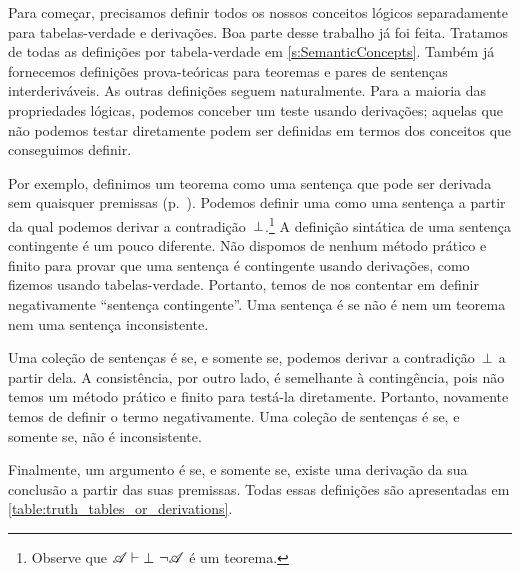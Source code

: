 Para começar, precisamos definir todos os nossos conceitos lógicos separadamente para tabelas-verdade e derivações. Boa parte desse trabalho já foi feita. Tratamos de todas as definições por tabela-verdade em \cref{s:SemanticConcepts}. Também já fornecemos definições prova-teóricas para teoremas e pares de sentenças interderiváveis. As outras definições seguem naturalmente. Para a maioria das propriedades lógicas, podemos conceber um teste usando derivações; aquelas que não podemos testar diretamente podem ser definidas em termos dos conceitos que conseguimos definir.

Por exemplo, definimos um teorema como uma sentença que pode ser derivada
sem quaisquer premissas (p.~\pageref{def:syntactic_tautology_in_sl}).
Podemos definir uma %
\label{def:syntactic_contradiction_in_sl} como uma sentença a partir da qual
podemos derivar a contradição~$\bot$.\footnote{Observe que $\mathscr{A}
\vdash \bot$ \ifeff{} $\lnot \mathscr{A}$ é um teorema.} A definição sintática
de uma sentença contingente é um pouco diferente. Não dispomos de nenhum
método prático e finito para provar que uma sentença é contingente usando
derivações, como fizemos usando tabelas-verdade. Portanto, temos de nos
contentar em definir negativamente ``sentença contingente''. Uma sentença é
\label{def:syntactically_contingent_in_sl} se não é nem um teorema nem uma
sentença inconsistente.

Uma coleção de sentenças é 
\label{def:syntactically_inconsistent_ in_sl} se, e somente se, podemos
derivar a contradição~$\bot$ a partir dela. A consistência, por outro lado,
é semelhante à contingência, pois não temos um método prático e finito para
testá-la diretamente. Portanto, novamente temos de definir o termo
negativamente. Uma coleção de sentenças é 
\label{def:syntactically consistent in SL} se, e somente se, não é
inconsistente.

Finalmente, um argumento é 
\label{def:syntactically_valid_in_SL} se, e somente se, existe uma derivação
da sua conclusão a partir das suas premissas. Todas essas definições são
apresentadas em \cref{table:truth_tables_or_derivations}.

